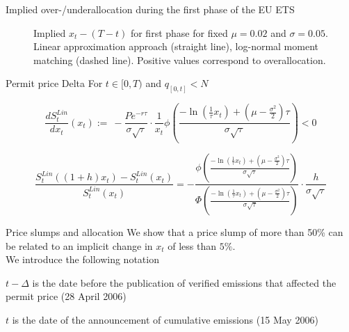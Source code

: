 {Implied over-/underallocation during the first phase of the EU ETS}
\begin{center}
\begin{figure}[h!]
\centering
{}
\caption{\tiny Implied $x_t - (T-t)$ for first phase for fixed  $\mu = 0.02$ and $\sigma = 0.05$. Linear approximation approach (straight line), log-normal moment matching (dashed line). Positive values correspond to overallocation.}
\label{fig:plot10}
\end{figure}
\end{center}



{Permit price Delta}
For $t \in [0,T)$ and $q_{[0,t]} < N$


$$
\frac{dS_t^{Lin}}{dx_t}(x_t) := \ - \frac{P e^{-r \tau}}{\sigma\sqrt{\tau}} \cdot \frac{1}{x_t} \phi \left( \frac{-\ln\left( \frac{1}{\tau} x_t \right) + \left( \mu - \frac{\sigma^2}{2} \right) \tau}{\sigma \sqrt{\tau}}\right) < 0
$$

$$
\frac{S_t^{Lin}((1+h)x_t)-S_t^{Lin}(x_t)}{S_t^{Lin}(x_t)}=
  -\frac{\phi \left( \frac{-\ln\left( \frac{1}{\tau} x_t \right) + \left( \mu - \frac{\sigma^2}{2} \right) \tau}{\sigma \sqrt{\tau}}\right)}{\Phi \left( \frac{-\ln\left( \frac{1}{\tau} x_t \right) + \left( \mu - \frac{\sigma^2}{2} \right) \tau}{\sigma \sqrt{\tau}}\right)}\cdot \frac{h}{\sigma \sqrt{\tau}}
$$


{Price slumps and allocation}
We show that a price slump of more than 50\% can be related to an implicit change in $x_t$ of less than $5\%$.\\

We introduce the following notation


	$t - \Delta$ is the date before the publication of verified emissions that affected the permit price (28 April 2006)

	$t$ is the date of the announcement of cumulative emissions (15 May 2006)


